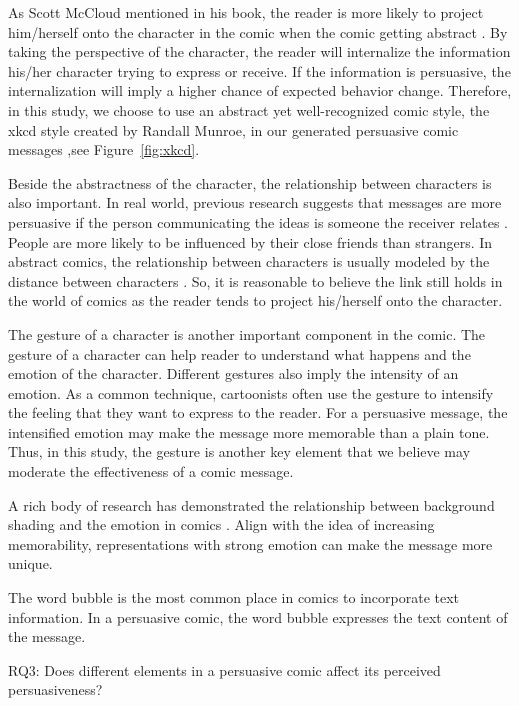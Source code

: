 As Scott McCloud mentioned in his book, the reader is more likely to project him/herself onto the character in the comic when the comic getting abstract \cite{scott1993understanding}. By taking the perspective of the character, the reader will internalize the information his/her character trying to express or receive. If the information is persuasive, the internalization will imply a higher chance of expected behavior change. Therefore, in this study, we choose to use an abstract yet well-recognized comic style, the xkcd style created by Randall Munroe, in our generated persuasive comic messages \cite{munroe2009xkcd},see Figure~\ref{fig:xkcd}.

Beside the abstractness of the character, the relationship between characters is also important. In real world, previous research suggests that messages are more persuasive if the person communicating the ideas is someone the receiver relates \cite{daddis2008influence,merga2014peer,shin2013user}. People are more likely to be influenced by their close friends than strangers. In abstract comics, the relationship between characters is usually modeled by the distance between characters \cite{scott1993understanding}. So, it is reasonable to believe the link still holds in the world of comics as the reader tends to project his/herself onto the character.

The gesture of a character is another important component in the comic. The gesture of a character can help reader to understand what happens and the emotion of the character. Different gestures also imply the intensity of an emotion. As a common technique, cartoonists often use the gesture to intensify the feeling that they want to express to the reader. For a persuasive message, the intensified emotion may make the message more memorable than a plain tone. Thus, in this study, the gesture is another key element that we believe may moderate the effectiveness of a comic message.

A rich body of research has demonstrated the relationship between background shading and the emotion in comics \cite{scott1993understanding}. Align with the idea of increasing memorability, representations with strong emotion can make the message more unique.

The word bubble is the most common place in comics to incorporate text information. In a persuasive comic, the word bubble expresses the text content of the message.

RQ3: Does different elements in a persuasive comic affect its perceived persuasiveness?
